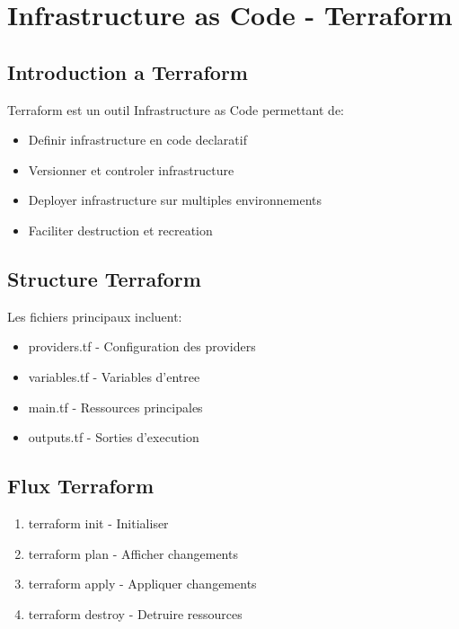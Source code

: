 \documentclass[12pt,a4paper]{report}
\begin{document}
\newpage

\chapter{Infrastructure as Code - Terraform}

\section{Introduction a Terraform}

Terraform est un outil Infrastructure as Code permettant de:
\begin{itemize}
    \item Definir infrastructure en code declaratif
    \item Versionner et controler infrastructure
    \item Deployer infrastructure sur multiples environnements
    \item Faciliter destruction et recreation
\end{itemize}

\section{Structure Terraform}

Les fichiers principaux incluent:

\begin{itemize}
    \item providers.tf - Configuration des providers
    \item variables.tf - Variables d'entree
    \item main.tf - Ressources principales
    \item outputs.tf - Sorties d'execution
\end{itemize}

\section{Flux Terraform}

\begin{enumerate}
    \item terraform init - Initialiser
    \item terraform plan - Afficher changements
    \item terraform apply - Appliquer changements
    \item terraform destroy - Detruire ressources
\end{enumerate}
\end{document}
